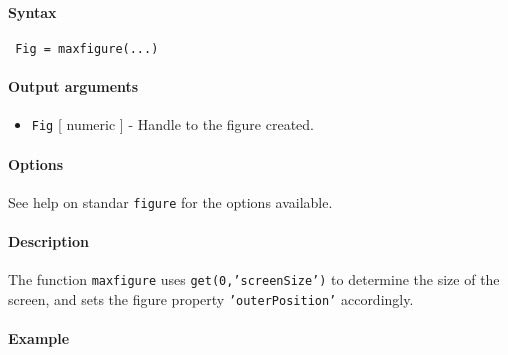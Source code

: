 


	\paragraph{Syntax}
 
 \begin{verbatim}
 Fig = maxfigure(...)
 \end{verbatim}
 
 \paragraph{Output arguments}
 
 \begin{itemize}
 \item
   \texttt{Fig} {[} numeric {]} - Handle to the figure created.
 \end{itemize}
 
 \paragraph{Options}
 
 See help on standar \texttt{figure} for the options available.
 
 \paragraph{Description}
 
 The function \texttt{maxfigure} uses \texttt{get(0,'screenSize')} to
 determine the size of the screen, and sets the figure property
 \texttt{'outerPosition'} accordingly.
 
 \paragraph{Example}


